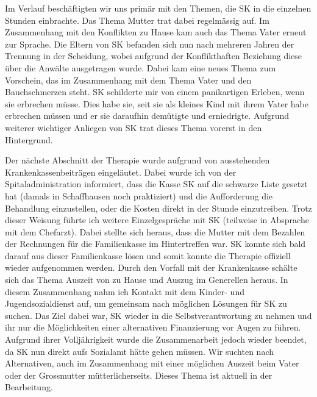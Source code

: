 Im Verlauf beschäftigten wir uns primär mit den Themen, die SK in die einzelnen Stunden einbrachte. Das Thema Mutter trat dabei regelmässig auf. Im Zusammenhang mit den Konflikten zu Hause kam auch das Thema Vater erneut zur Sprache. Die Eltern von SK befanden sich nun nach mehreren Jahren der Trennung in der Scheidung, wobei aufgrund der Konflikthaften Beziehung diese über die Anwälte ausgetragen wurde. Dabei kam eine neues Thema zum Vorschein, das im Zusammenhang mit dem Thema Vater und den Bauchschmerzen steht. SK schilderte mir von einem panikartigen Erleben, wenn sie erbrechen müsse. Dies habe sie, seit sie als kleines Kind mit ihrem Vater habe erbrechen müssen und er sie daraufhin demütigte und erniedrigte. Aufgrund weiterer wichtiger Anliegen von SK trat dieses Thema vorerst in den Hintergrund. 

Der nächste Abschnitt der Therapie wurde aufgrund von ausstehenden Krankenkassenbeiträgen eingeläutet. Dabei wurde ich von der Spitaladministration informiert, dass die Kasse SK auf die schwarze Liste gesetzt hat (damals in Schaffhausen noch praktiziert) und die Aufforderung die Behandlung einzustellen, oder die Kosten direkt in der Stunde einzutreiben. Trotz dieser Weisung führte ich weitere Einzelgespräche mit SK (teilweise in Absprache mit dem Chefarzt). Dabei stellte sich heraus, dass die Mutter mit dem Bezahlen der Rechnungen für die Familienkasse im Hintertreffen war. SK konnte sich bald darauf aus dieser Familienkasse lösen und somit konnte die Therapie offiziell wieder aufgenommen werden. Durch den Vorfall mit der Krankenkasse schälte sich das Thema Auszeit von zu Hause und Auszug im Generellen heraus. In diesem Zusammenhang nahm ich Kontakt mit dem Kinder- und Jugendsozialdienst auf, um gemeinsam nach möglichen Lösungen für SK zu suchen. Das Ziel dabei war, SK wieder in die Selbstverantwortung zu nehmen und ihr nur die Möglichkeiten einer alternativen Finanzierung vor Augen zu führen. Aufgrund ihrer Volljährigkeit wurde die Zusammenarbeit jedoch wieder beendet, da SK nun direkt aufs Sozialamt hätte gehen müssen. Wir suchten nach Alternativen, auch im Zusammenhang mit einer möglichen Auszeit beim Vater oder der Grossmutter mütterlicherseits. Dieses Thema ist aktuell in der Bearbeitung.

